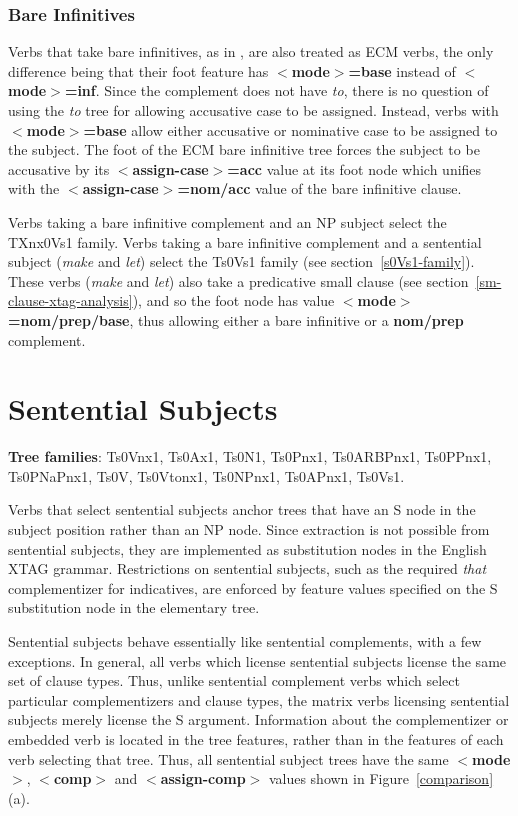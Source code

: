\subsubsection{Bare Infinitives}

Verbs that take bare infinitives, as in , are also treated as ECM
verbs, the only difference being that their foot feature has {\bf
$<$mode$>$=base} instead of {\bf $<$mode$>$=inf}.  Since the complement does
not have {\it to}, there is no question of using the {\it to} tree for allowing
accusative case to be assigned.  Instead, verbs with {\bf $<$mode$>$=base}
allow either accusative or nominative case to be assigned to the subject. The
foot of the ECM bare infinitive tree forces the subject to be accusative by its
{\bf $<$assign-case$>$=acc} value at its foot node which unifies with the {\bf
$<$assign-case$>$=nom/acc} value of the bare infinitive clause. 



Verbs
taking a bare infinitive complement and an NP subject select the
TXnx0Vs1 family.  Verbs taking a bare infinitive complement and a sentential
subject ({\it make} and {\it let}) select the Ts0Vs1 family (see 
section~\ref{s0Vs1-family}).  These verbs ({\it make} and {\it let}) also
take a predicative small clause (see section~\ref{sm-clause-xtag-analysis}),
and so the foot node has value {\bf $<$mode$>$=nom/prep/base}, thus allowing
either a bare infinitive or a {\bf nom/prep} complement.


\section{Sentential Subjects}
\label{sent-subjs}

{\bf Tree families}: Ts0Vnx1, Ts0Ax1, Ts0N1, Ts0Pnx1, Ts0ARBPnx1, 
Ts0PPnx1, Ts0PNaPnx1, Ts0V, Ts0Vtonx1, Ts0NPnx1, Ts0APnx1, Ts0Vs1.

Verbs that select sentential subjects anchor trees that have an S node
in the subject position rather than an NP node.  Since extraction is
not possible from sentential subjects, they are implemented as
substitution nodes in the English XTAG grammar.  Restrictions on
sentential subjects, such as the required {\it that} complementizer for
indicatives, are enforced by feature values specified on the S
substitution node in the elementary tree.  

Sentential subjects behave essentially like sentential complements, with a few
exceptions.  In general, all verbs which license sentential subjects license
the same set of clause types. Thus, unlike sentential complement verbs which
select particular complementizers and clause types, the matrix verbs licensing
sentential subjects merely license the S argument. Information about the
complementizer or embedded verb is located in the tree features, rather than in
the features of each verb selecting that tree.  Thus, all sentential subject
trees have the same {\bf $<$mode$>$}, {\bf $<$comp$>$} and {\bf
$<$assign-comp$>$} values shown in Figure~\ref{comparison}(a).

